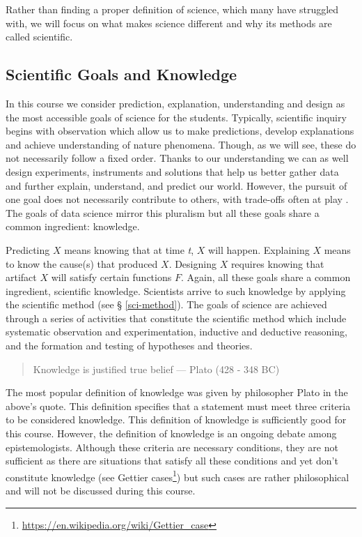 \documentclass[
  12pt,
]{book}
\DeclareRobustCommand{\href}[2]{#2\footnote{\url{#1}}}
\begin{document}
Rather than finding a proper definition of science, which many have struggled with, we will focus on what makes science different and why its methods are called scientific.

\subsection{Scientific Goals and Knowledge}\label{scientific-goals-and-knowledge}

In this course we consider prediction, explanation, understanding and design as the most accessible goals of science for the students. Typically, scientific inquiry begins with observation which allow us to make predictions, develop explanations and achieve understanding of nature phenomena. Though, as we will see, these do not necessarily follow a fixed order. Thanks to our understanding we can as well design experiments, instruments and solutions that help us better gather data and further explain, understand, and predict our world. However, the pursuit of one goal does not necessarily contribute to others, with trade-offs often at play \citep{potochnik2015diverse}. The goals of data science mirror this pluralism but all these goals share a common ingredient: knowledge.

Predicting \(X\) means knowing that at time \emph{t}, \(X\) will happen. Explaining \(X\) means to know the cause(s) that produced \(X\). Designing \(X\) requires knowing that artifact \(X\) will satisfy certain functions \(F\). Again, all these goals share a common ingredient, scientific knowledge. Scientists arrive to such knowledge by applying the scientific method (see § \ref{sci-method}). The goals of science are achieved through a series of activities that constitute the scientific method which include systematic observation and experimentation, inductive and deductive reasoning, and the formation and testing of hypotheses and theories.

\begin{quote}
Knowledge is justified true belief --- Plato (428 - 348 BC)
\end{quote}

The most popular definition of knowledge was given by philosopher Plato in the above's quote. This definition specifies that a statement must meet three criteria to be considered knowledge. This definition of knowledge is sufficiently good for this course. However, the definition of knowledge is an ongoing debate among epistemologists. Although these criteria are necessary conditions, they are not sufficient as there are situations that satisfy all these conditions and yet don't constitute knowledge (see \href{https://en.wikipedia.org/wiki/Gettier_case}{Gettier cases}) but such cases are rather philosophical and will not be discussed during this course.
\end{document}
